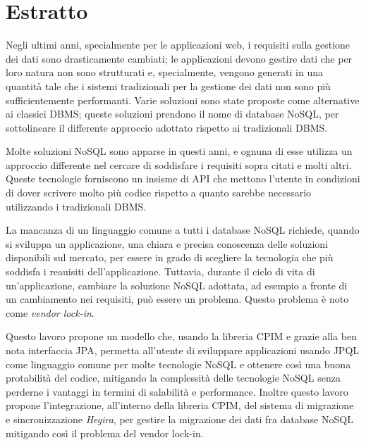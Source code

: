 \thispagestyle{empty}

\chapter*{Estratto}
Negli ultimi anni, specialmente per le applicazioni web, i requisiti sulla gestione dei dati sono drasticamente cambiati; le applicazioni devono gestire dati che per loro natura non sono strutturati e, specialmente, vengono generati in una quantit\`{a} tale che i sistemi tradizionali per la gestione dei dati non sono più sufficientemente performanti. Varie soluzioni sono state proposte come alternative ai classici DBMS; queste soluzioni prendono il nome di database NoSQL, per sottolineare il differente approccio adottato rispetto ai tradizionali DBMS.

\noindent Molte soluzioni NoSQL sono apparse in questi anni, e ognuna di esse utilizza un approccio differente nel cercare di soddisfare i requisiti sopra citati e molti altri. Queste tecnologie forniscono un insisme di API che mettono l'utente in condizioni di dover scrivere molto più codice rispetto a quanto sarebbe necessario utilizzando i tradizionali DBMS.

\noindent La mancanza di un linguaggio comune a tutti i database NoSQL richiede, quando si sviluppa un applicazione, una chiara e precisa conoscenza delle soluzioni disponibili sul mercato, per essere in grado di scegliere la tecnologia che pi\`{u} soddisfa i reauisiti dell'applicazione. Tuttavia, durante il ciclo di vita di un'applicazione, cambiare la soluzione NoSQL adottata, ad esempio a fronte di un cambiamento nei requisiti, pu\`{o} essere un problema. Questo problema \`{e} noto come \textit{vendor lock-in}.

\noindent Questo lavoro propone un modello che, usando la libreria CPIM e grazie alla ben nota interfaccia JPA, permetta all'utente di sviluppare applicazioni usando JPQL come linguaggio comune per molte tecnologie NoSQL e ottenere cos\`{i} una buona protabilità del codice, mitigando la complessit\`{a} delle tecnologie NoSQL senza perderne i vantaggi in termini di salabilit\`{a} e performance. Inoltre questo lavoro propone l'integrazione, all'interno della libreria CPIM, del sistema di migrazione e sincronizzazione \textit{Hegira}, per gestire la migrazione dei dati fra database NoSQL mitigando cos\`{i} il problema del vendor lock-in.

